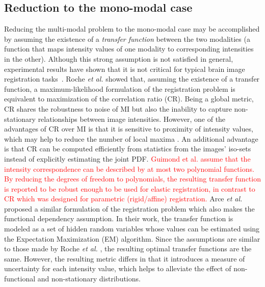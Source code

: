 \vspace{-0.2cm}
\subsection{Reduction to the mono-modal case}
Reducing the multi-modal problem to the mono-modal case may be accomplished by assuming the existence of a {\it transfer function} between the two modalities (a function that maps intensity values of one modality to corresponding intensities in the other). Although this strong assumption is not satisfied in general, experimental results have shown that it is not critical for typical brain image registration tasks~\cite{Roche1998}. Roche {\it et al.} \cite{Roche2000} showed that, assuming the existence of a transfer function, a maximum-likelihood formulation of the registration problem is equivalent to maximization of the correlation ratio (CR). Being a global metric, CR shares the robustness to noise of MI but also the inability to capture non-stationary relationships between image intensities. However, one of the advantages of CR over MI is that it is sensitive to proximity of intensity values, which may help to reduce the number of local maxima \cite{Roche1998}. An additional advantage is that CR can be computed efficiently from statistics from the images' iso-sets instead of explicitly estimating the joint PDF. \textcolor{red}{ Guimond et al. \cite{Guimond2001} assume that the intensity correspondence can be described by at most two polynomial functions. By reducing the degrees of freedom to polynomials, the resulting transfer function is reported to be robust enough to be used for elastic registration, in contrast to CR which was designed for parametric (rigid/affine) registration.} Arce {\it et al.} \cite{Arce-santana2014} proposed a similar formulation of the registration problem which also makes the functional dependency assumption. In their work, the transfer function is modeled as a set of hidden random variables whose values can be estimated using the Expectation Maximization (EM) algorithm. Since the assumptions are similar to those made by Roche {\it et al.} \cite{Roche1998, Roche2000}, the resulting optimal transfer functions are the same. However, the resulting metric differs in that it introduces a measure of uncertainty for each intensity value, which helps to alleviate the effect of non-functional and non-stationary distributions.\\

